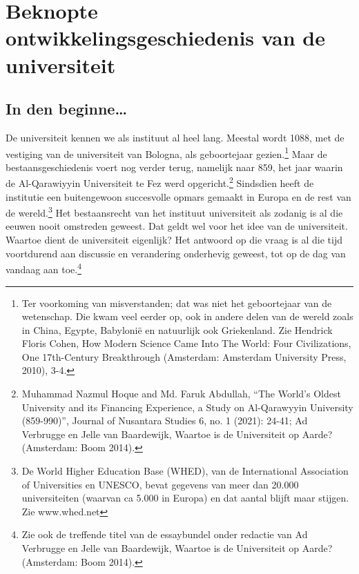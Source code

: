 \documentclass[empirical, authordate, ]{new-jote-article}
\begin{document}
	\chapter{Beknopte ontwikkelingsgeschiedenis van de universiteit }











	\section{In den beginne…}



	De universiteit kennen we als instituut al heel lang. Meestal wordt 1088, met de vestiging van de universiteit van Bologna, als geboortejaar gezien.\footnote{Ter voorkoming van misverstanden; dat was niet het geboortejaar van de wetenschap. Die kwam veel eerder op, ook in andere delen van de wereld zoals in China, Egypte, Babylonië en natuurlijk ook Griekenland. Zie Hendrick Floris Cohen, How Modern Science Came Into The World: Four Civilizations, One 17th-Century Breakthrough (Amsterdam: Amsterdam University Press, 2010), 3-4.} Maar de bestaansgeschiedenis voert nog verder terug, namelijk naar 859, het jaar waarin de Al-Qarawiyyin Universiteit te Fez werd opgericht.\footnote{Muhammad Nazmul Hoque and Md. Faruk Abdullah, “The World's Oldest University and its Financing Experience, a Study on Al-Qarawyyin University (859-990)”, Journal of Nusantara Studies 6, no. 1 (2021): 24-41; Ad Verbrugge en Jelle van Baardewijk, Waartoe is de Universiteit op Aarde? (Amsterdam: Boom 2014).} Sindsdien heeft de institutie een buitengewoon succesvolle opmars gemaakt in Europa en de rest van de wereld.\footnote{De World Higher Education Base (WHED), van de International Association of Universities en UNESCO, bevat gegevens van meer dan 20.000 universiteiten (waarvan ca 5.000 in Europa) en dat aantal blijft maar stijgen. Zie www.whed.net} Het bestaansrecht van het instituut universiteit als zodanig is al die eeuwen nooit omstreden geweest. Dat geldt wel voor het idee van de universiteit. Waartoe dient de universiteit eigenlijk? Het antwoord op die vraag is al die tijd voortdurend aan discussie en verandering onderhevig geweest, tot op de dag van vandaag aan toe.\footnote{Zie ook de treffende titel van de essaybundel onder redactie van Ad Verbrugge en Jelle van Baardewijk, Waartoe is de Universiteit op Aarde? (Amsterdam: Boom 2014).}
\end{document}
